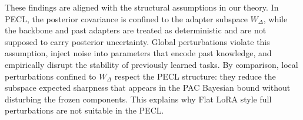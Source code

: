 \documentclass{article}
\theoremstyle{plain}
\theoremstyle{definition}
\theoremstyle{remark}
\begin{document}
These findings are aligned with the structural assumptions in our theory. 
In PECL, the posterior covariance is confined to the adapter subspace $W_\Delta$, while the backbone and past adapters are treated as deterministic and are not supposed to carry posterior uncertainty. 
Global perturbations violate this assumption, inject noise into parameters that encode past knowledge, and empirically disrupt the stability of previously learned tasks. 
By comparison, local perturbations confined to $W_\Delta$ respect the PECL structure: they reduce the subspace expected sharpness that appears in the PAC Bayesian bound without disturbing the frozen components. 
This explains why Flat LoRA style full perturbations are not suitable in the PECL.

\begin{table}[thpb]
\centering
\caption{$\operatorname{AAA}^{\mathrm{cls}}$ and $\operatorname{AAA}^{\mathrm{ncm}}$ under global (full model) versus subspace (LoRA only).}
\label{tab:lora——or_full}
\setlength{\tabcolsep}{3pt}
\renewcommand{\arraystretch}{1}
\end{table}
\end{document}
